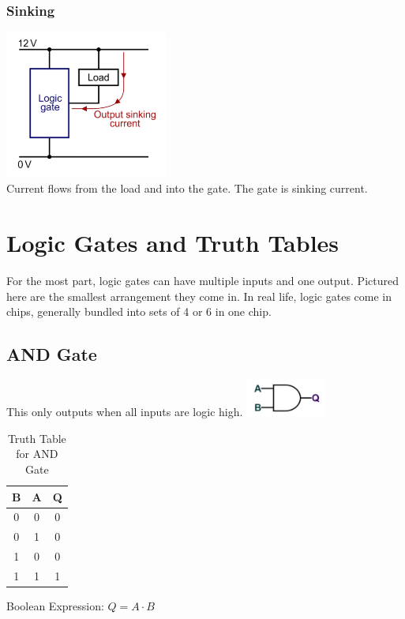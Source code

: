 \documentclass[a4paper,11pt, twocolumn]{article}
\begin{document}
\subsubsection{Sinking}
\includegraphics[width=0.4\textwidth]{sinking.PNG}\\
Current flows from the load and into the gate. The gate is sinking current.

\section{Logic Gates and Truth Tables}
For the most part, logic gates can have multiple inputs and one output. Pictured here are the smallest arrangement they come in. In real life, logic gates come in chips, generally bundled into sets of 4 or 6 in one chip.
\subsection{AND Gate}
This only outputs when all inputs are logic high.
\includegraphics[width=0.2\textwidth]{andGate.PNG}
\begin{table}[H]
    \centering
    \begin{tabularx}{0.127\textwidth}{c|c|c}
    B & A & Q \\
    \hline
    0 & 0 & 0 \\
    0 & 1 & 0 \\
    1 & 0 & 0 \\
    1 & 1 & 1
    \end{tabularx}
    \caption{Truth Table for AND Gate}
\end{table}
Boolean Expression: $Q=A \cdot B$
\end{document}
